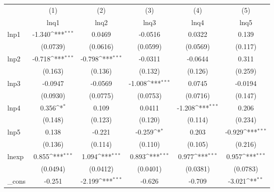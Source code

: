 {
\def\sym#1{\ifmmode^{#1}\else\(^{#1}\)\fi}
\begin{tabular}{l*{5}{c}}
\hline\hline
            &\multicolumn{1}{c}{(1)}&\multicolumn{1}{c}{(2)}&\multicolumn{1}{c}{(3)}&\multicolumn{1}{c}{(4)}&\multicolumn{1}{c}{(5)}\\
            &\multicolumn{1}{c}{lnq1}&\multicolumn{1}{c}{lnq2}&\multicolumn{1}{c}{lnq3}&\multicolumn{1}{c}{lnq4}&\multicolumn{1}{c}{lnq5}\\
\hline
lnp1        &      -1.340\sym{***}&      0.0469         &     -0.0516         &      0.0322         &       0.139         \\
            &    (0.0739)         &    (0.0616)         &    (0.0599)         &    (0.0569)         &     (0.117)         \\
[1em]
lnp2        &      -0.718\sym{***}&      -0.798\sym{***}&     -0.0311         &     -0.0644         &       0.311         \\
            &     (0.163)         &     (0.136)         &     (0.132)         &     (0.126)         &     (0.259)         \\
[1em]
lnp3        &     -0.0947         &     -0.0569         &      -1.008\sym{***}&      0.0745         &     -0.0194         \\
            &    (0.0930)         &    (0.0775)         &    (0.0753)         &    (0.0716)         &     (0.147)         \\
[1em]
lnp4        &       0.356\sym{*}  &       0.109         &      0.0411         &      -1.208\sym{***}&       0.206         \\
            &     (0.148)         &     (0.123)         &     (0.120)         &     (0.114)         &     (0.234)         \\
[1em]
lnp5        &       0.138         &      -0.221         &      -0.259\sym{*}  &       0.203         &      -0.929\sym{***}\\
            &     (0.136)         &     (0.114)         &     (0.110)         &     (0.105)         &     (0.216)         \\
[1em]
lnexp       &       0.855\sym{***}&       1.094\sym{***}&       0.893\sym{***}&       0.977\sym{***}&       0.957\sym{***}\\
            &    (0.0494)         &    (0.0412)         &    (0.0401)         &    (0.0381)         &    (0.0783)         \\
[1em]
\_cons      &      -0.251         &      -2.199\sym{***}&      -0.626         &      -0.709         &      -3.021\sym{**} \\

\end{tabular}}
